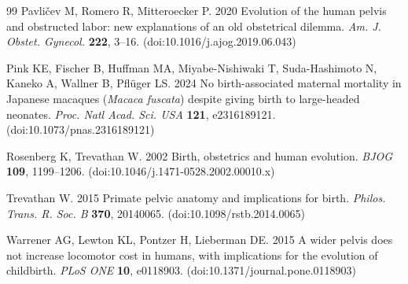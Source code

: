 \documentclass[11pt,a4paper]{article}
\begin{document}
\begin{thebibliography}{99}
Pavli\v{c}ev M, Romero R, Mitteroecker P. 2020 Evolution of the human pelvis and obstructed labor: new explanations of an old obstetrical dilemma. \emph{Am. J. Obstet. Gynecol.} \textbf{222}, 3--16. (doi:10.1016/j.ajog.2019.06.043)

Pink KE, Fischer B, Huffman MA, Miyabe-Nishiwaki T, Suda-Hashimoto N, Kaneko A, Wallner B, Pfl\"uger LS. 2024 No birth-associated maternal mortality in Japanese macaques (\emph{Macaca fuscata}) despite giving birth to large-headed neonates. \emph{Proc. Natl Acad. Sci. USA} \textbf{121}, e2316189121. (doi:10.1073/pnas.2316189121)

Rosenberg K, Trevathan W. 2002 Birth, obstetrics and human evolution. \emph{BJOG} \textbf{109}, 1199--1206. (doi:10.1046/j.1471-0528.2002.00010.x)

Trevathan W. 2015 Primate pelvic anatomy and implications for birth. \emph{Philos. Trans. R. Soc. B} \textbf{370}, 20140065. (doi:10.1098/rstb.2014.0065)

Warrener AG, Lewton KL, Pontzer H, Lieberman DE. 2015 A wider pelvis does not increase locomotor cost in humans, with implications for the evolution of childbirth. \emph{PLoS ONE} \textbf{10}, e0118903. (doi:10.1371/journal.pone.0118903)

\end{thebibliography}
\end{document}
